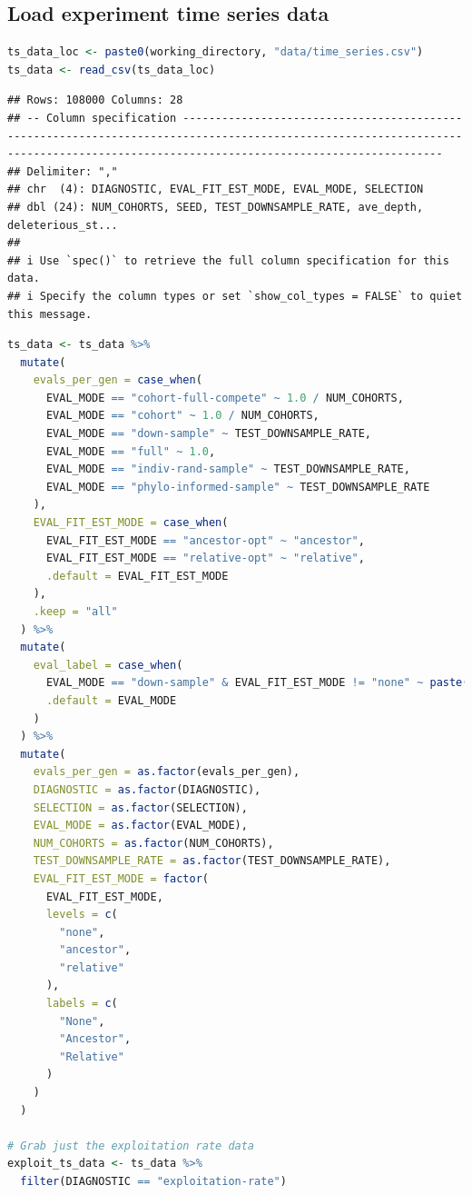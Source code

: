 \documentclass[
]{book}
\begin{document}
\hypertarget{load-experiment-time-series-data}{%
\subsection{Load experiment time series data}\label{load-experiment-time-series-data}}

\begin{lstlisting}[language=R]
ts_data_loc <- paste0(working_directory, "data/time_series.csv")
ts_data <- read_csv(ts_data_loc)
\end{lstlisting}

\begin{lstlisting}
## Rows: 108000 Columns: 28
## -- Column specification ------------------------------------------------------------------------------------------------------------------------------------------------------------------------------------
## Delimiter: ","
## chr  (4): DIAGNOSTIC, EVAL_FIT_EST_MODE, EVAL_MODE, SELECTION
## dbl (24): NUM_COHORTS, SEED, TEST_DOWNSAMPLE_RATE, ave_depth, deleterious_st...
## 
## i Use `spec()` to retrieve the full column specification for this data.
## i Specify the column types or set `show_col_types = FALSE` to quiet this message.
\end{lstlisting}

\begin{lstlisting}[language=R]
ts_data <- ts_data %>%
  mutate(
    evals_per_gen = case_when(
      EVAL_MODE == "cohort-full-compete" ~ 1.0 / NUM_COHORTS,
      EVAL_MODE == "cohort" ~ 1.0 / NUM_COHORTS,
      EVAL_MODE == "down-sample" ~ TEST_DOWNSAMPLE_RATE,
      EVAL_MODE == "full" ~ 1.0,
      EVAL_MODE == "indiv-rand-sample" ~ TEST_DOWNSAMPLE_RATE,
      EVAL_MODE == "phylo-informed-sample" ~ TEST_DOWNSAMPLE_RATE
    ),
    EVAL_FIT_EST_MODE = case_when(
      EVAL_FIT_EST_MODE == "ancestor-opt" ~ "ancestor",
      EVAL_FIT_EST_MODE == "relative-opt" ~ "relative",
      .default = EVAL_FIT_EST_MODE
    ),
    .keep = "all"
  ) %>%
  mutate(
    eval_label = case_when(
      EVAL_MODE == "down-sample" & EVAL_FIT_EST_MODE != "none" ~ paste("down-sample", EVAL_FIT_EST_MODE, sep="-"),
      .default = EVAL_MODE
    )
  ) %>%
  mutate(
    evals_per_gen = as.factor(evals_per_gen),
    DIAGNOSTIC = as.factor(DIAGNOSTIC),
    SELECTION = as.factor(SELECTION),
    EVAL_MODE = as.factor(EVAL_MODE),
    NUM_COHORTS = as.factor(NUM_COHORTS),
    TEST_DOWNSAMPLE_RATE = as.factor(TEST_DOWNSAMPLE_RATE),
    EVAL_FIT_EST_MODE = factor(
      EVAL_FIT_EST_MODE,
      levels = c(
        "none",
        "ancestor",
        "relative"
      ),
      labels = c(
        "None",
        "Ancestor",
        "Relative"
      )
    )
  )

# Grab just the exploitation rate data
exploit_ts_data <- ts_data %>%
  filter(DIAGNOSTIC == "exploitation-rate")
\end{lstlisting}
\end{document}
